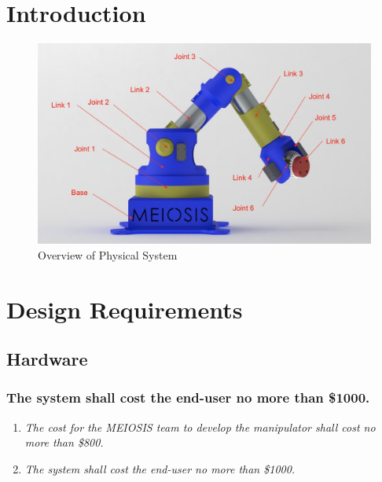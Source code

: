 \documentclass[12pt]{report}
\begin{document}
\normalem

{\tableofcontents\let\clearpage\relax\listoffigures}
\clearpage
\newpage


{}

\section{Introduction}
\raggedright
\begin{figure}[htp]
  \centering
  \includegraphics[frame,width=.75\textwidth]{model}
  \caption{Overview of Physical System}
  \label{fig:model}
\end{figure}
\section{Design Requirements}
\subsection{Hardware}

\subsubsection{The system shall cost the end-user no more than \$1000.}
\begin{enumerate}[label=\thesubsubsection.\alph*,leftmargin=3cm,font=\itshape]
  \item \textit{The cost for the MEIOSIS team to develop the manipulator shall cost no more than \$800.}
  \item \textit{The system shall cost the end-user no more than \$1000.}
\end{enumerate}
\end{document}
